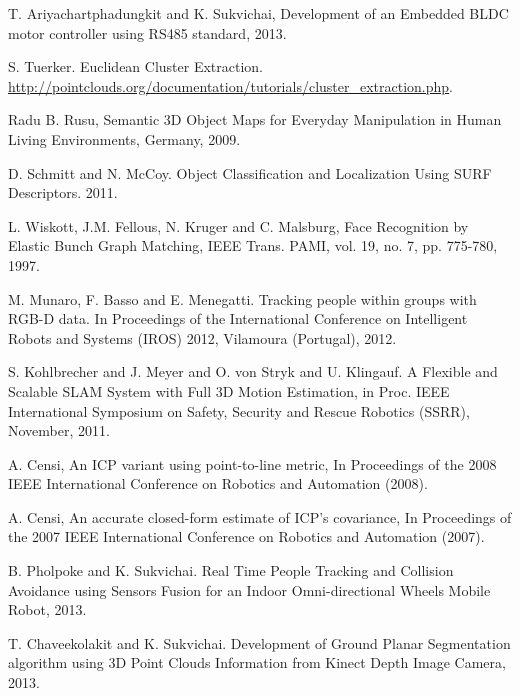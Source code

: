 \documentclass{llncs}
\begin{document}
\begin{thebibliography}{4}

 T. Ariyachartphadungkit and K. Sukvichai, Development of an Embedded BLDC motor controller using RS485 standard, 2013.

 S. Tuerker. Euclidean Cluster Extraction.\\
\url{http://pointclouds.org/documentation/tutorials/cluster_extraction.php}.

 Radu B. Rusu, 
Semantic 3D Object Maps for Everyday Manipulation in Human Living Environments, Germany, 2009.

 D. Schmitt and N. McCoy. Object Classification and Localization Using SURF Descriptors. 2011.

 L. Wiskott, J.M. Fellous, N. Kruger and C. Malsburg, Face Recognition by Elastic Bunch Graph Matching, IEEE Trans. PAMI, vol. 19, no. 7, pp. 775-780, 1997. 

 M. Munaro, F. Basso and E. Menegatti. Tracking people within groups with RGB-D data. In Proceedings of the International Conference on Intelligent Robots and Systems (IROS) 2012, Vilamoura (Portugal), 2012.

 S. Kohlbrecher and J. Meyer and O. von Stryk and U. Klingauf. A Flexible and Scalable SLAM System with Full 3D Motion Estimation, in Proc. IEEE International Symposium on Safety, Security and Rescue Robotics (SSRR), November, 2011.

 A. Censi, An ICP variant using point-to-line metric, In Proceedings of the 2008 IEEE International Conference on Robotics and Automation (2008).

 A. Censi, An accurate closed-form estimate of ICP's covariance, In Proceedings of the 2007 IEEE International Conference on Robotics and Automation (2007).

 B. Pholpoke and K. Sukvichai. Real Time People Tracking and Collision Avoidance using Sensors Fusion for an Indoor Omni-directional Wheels Mobile Robot, 2013.

 T. Chaveekolakit and K. Sukvichai. Development of Ground Planar Segmentation algorithm using 3D Point Clouds Information from Kinect Depth Image Camera, 2013.

\end{thebibliography}
\end{document}
